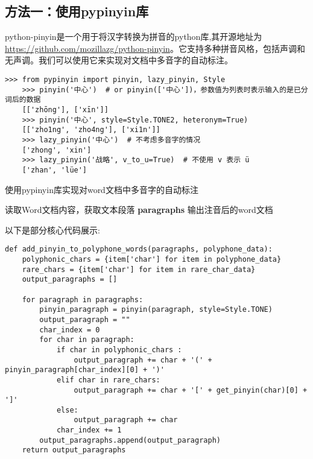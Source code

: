 \documentclass[12pt,hyperref,a4paper,UTF8]{ctexart}
\begin{document}
\subsection{方法一：使用pypinyin库}
python-pinyin是一个用于将汉字转换为拼音的python库,其开源地址为\url{https://github.com/mozillazg/python-pinyin}。它支持多种拼音风格，包括声调和无声调。我们可以使用它来实现对文档中多音字的自动标注。
\begin{lstlisting}[caption={python-pinyin的使用示例}, label={lst:example}]
    >>> from pypinyin import pinyin, lazy_pinyin, Style
    >>> pinyin('中心')  # or pinyin(['中心'])，参数值为列表时表示输入的是已分词后的数据
    [['zhōng'], ['xīn']]
    >>> pinyin('中心', style=Style.TONE2, heteronym=True)
    [['zho1ng', 'zho4ng'], ['xi1n']]
    >>> lazy_pinyin('中心')  # 不考虑多音字的情况
    ['zhong', 'xin']
    >>> lazy_pinyin('战略', v_to_u=True)  # 不使用 v 表示 ü
    ['zhan', 'lüe']
\end{lstlisting}
\begin{algorithm}[H]
    \caption{使用pypinyin库实现对word文档中多音字的自动标注}
    
    
    
    \BlankLine
    读取Word文档内容，获取文本段落 \textbf{paragraphs}\;
    输出注音后的word文档\;
\end{algorithm}
\vspace{\baselineskip}
以下是部分核心代码展示:
\begin{lstlisting}[caption={pypinyin自动注音的部分核心代码展示}, label={lst:example}]
    def add_pinyin_to_polyphone_words(paragraphs, polyphone_data):
    polyphonic_chars = {item['char'] for item in polyphone_data}
    rare_chars = {item['char'] for item in rare_char_data}
    output_paragraphs = []

    for paragraph in paragraphs:
        pinyin_paragraph = pinyin(paragraph, style=Style.TONE)
        output_paragraph = ""
        char_index = 0
        for char in paragraph:
            if char in polyphonic_chars :
                output_paragraph += char + '(' + pinyin_paragraph[char_index][0] + ')'
            elif char in rare_chars:
                output_paragraph += char + '[' + get_pinyin(char)[0] + ']'
            else:
                output_paragraph += char
            char_index += 1
        output_paragraphs.append(output_paragraph)
    return output_paragraphs
\end{lstlisting}
\end{document}
